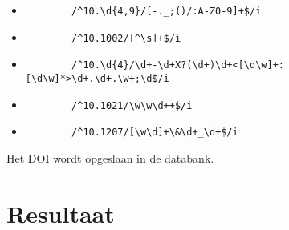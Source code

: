\begin{itemize}
    \item \begin{verbatim}
        /^10.\d{4,9}/[-._;()/:A-Z0-9]+$/i
    \end{verbatim}
    \item \begin{verbatim}
        /^10.1002/[^\s]+$/i
    \end{verbatim}
    \item \begin{verbatim}
        /^10.\d{4}/\d+-\d+X?(\d+)\d+<[\d\w]+:[\d\w]*>\d+.\d+.\w+;\d$/i
    \end{verbatim}
    \item \begin{verbatim}
        /^10.1021/\w\w\d++$/i
    \end{verbatim}
    \item \begin{verbatim}
        /^10.1207/[\w\d]+\&\d+_\d+$/i
    \end{verbatim}
\end{itemize}
Het DOI wordt opgeslaan in de databank.
\section{Resultaat}
